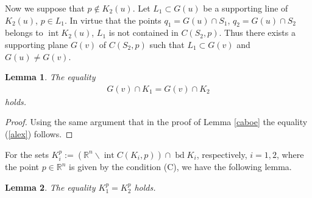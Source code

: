 \documentclass[12pt]{amsart}
\newcommand{\inte}{\operatorname*{int}}
\newcommand{\bd}{\operatorname*{bd}}
\newtheorem{lemma}{Lemma}
\begin{document}
Now we suppose that $p\notin K_2(u)$. Let $L_1 \subset G(u)$ be a supporting line of $ K_2(u)$, $p\in L_1$. In virtue that the points $q_1=G(u)  \cap S_1$, $q_2= G(u) \cap S_2 $ belongs to $\inte K_2(u)$, $L_1$ is not contained in $C(S_2,p)$. Thus there exists a supporting plane $G(v)$ of $C(S_2,p)$ such that $L_1\subset G(v)$ and $G(u)\not=G(v)$.  
\begin{lemma} \label{mambo} 
The equality 
\begin{eqnarray}\label{alex}
G(v) \cap K_1=G(v) \cap K_2
\end{eqnarray} 
holds.
\end{lemma}
 \begin{proof} 
Using the same argument that in the proof of Lemma \ref{caboe} the equality (\ref{alex}) follows.    
\end{proof}
 For the sets $K_i^p:=(\mathbb{R}^n \backslash \inte C(K_i,p)) \cap \bd K_i$, respectively, $i=1,2$, where the point $p \in \mathbb{R}^n$ is given by the condition (C), we have the following lemma.
\begin{lemma} \label{choco} 
The equality $K_1^p=K_2^p$ holds.
\end{lemma}
\end{document}
